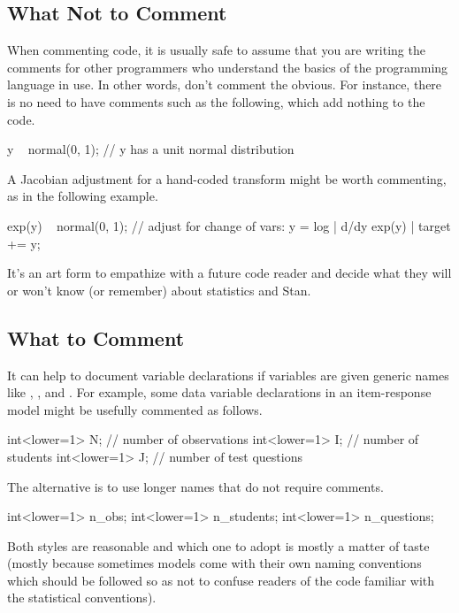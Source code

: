 \subsection{What Not to Comment}

When commenting code, it is usually safe to assume that you are 
writing the comments for other programmers who understand the basics 
of the programming language in use.  In other words, don't comment the
obvious.  For instance, there is no need to have comments
such as the following, which add nothing to the code.
%
\begin{stancode}
y ~ normal(0, 1);  // y has a unit normal distribution
\end{stancode}
%
A Jacobian adjustment for a hand-coded transform might be worth
commenting, as in the following example.
%
\begin{stancode}
exp(y) ~ normal(0, 1);
// adjust for change of vars: y = log | d/dy exp(y) |
target += y;
\end{stancode}
%
It's an art form to empathize with a future code reader and decide
what they will or won't know (or remember) about statistics and Stan.

\subsection{What to Comment}

It can help to document variable declarations if variables are given
generic names like , , and .  For
example, some data variable declarations in an item-response model
might be usefully commented as follows.
%
\begin{stancode}
int<lower=1> N;   // number of observations
int<lower=1> I;   // number of students
int<lower=1> J;   // number of test questions
\end{stancode}
%
The alternative is to use longer names that do not require comments.
%
\begin{stancode}
int<lower=1> n_obs;
int<lower=1> n_students;
int<lower=1> n_questions;
\end{stancode}
%
Both styles are reasonable and which one to adopt is mostly a matter of
taste (mostly because sometimes models come with their own naming
conventions which should be followed so as not to confuse readers of
the code familiar with the statistical conventions).

